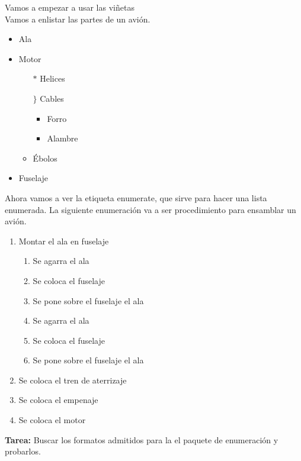 \documentclass{article}
\begin{document}
Vamos a empezar a usar las viñetas\\
Vamos a enlistar las partes de un avión.
\begin{itemize}
	\item Ala
	\item Motor
	\begin{itemize}
		\item[$*$] Helices
		\item[$\}$] Cables
		\begin{itemize}
			\item Forro
			\item Alambre
		\end{itemize}
		\item Ébolos
	\end{itemize}
	\item Fuselaje 
\end{itemize}


Ahora vamos a ver la etiqueta enumerate, que sirve para hacer una lista enumerada. La siguiente enumeración va a ser procedimiento para ensamblar un avión.

\begin{enumerate}
	\item Montar el ala en fuselaje
	\begin{enumerate}[i]
		\item Se agarra el ala
		\item Se coloca el fuselaje
		\item Se pone sobre el fuselaje el ala
		\item Se agarra el ala
		\item Se coloca el fuselaje
		\item Se pone sobre el fuselaje el ala
	\end{enumerate}
	\item Se coloca el tren de aterrizaje
	\item Se coloca el empenaje
	\item Se coloca el motor
\end{enumerate}


\Huge \textbf{Tarea:} Buscar los formatos admitidos para la el paquete de enumeración y probarlos.
\end{document}
